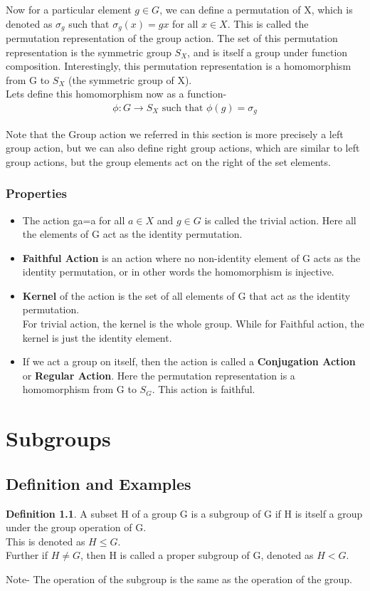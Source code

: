 \documentclass[12pt,a4paper,oneside]{report}
\theoremstyle{definition}
\newtheorem{definition}{Definition}[chapter]
\begin{document}
Now for a particular element $g\in G$, we can define a permutation of X, which is denoted as $\sigma_g$ such that $\sigma_g(x)=gx$ for all $x\in X$. This is called the permutation representation of the group action. The set of this permutation representation is the symmetric group $S_X$, and is itself a group under function composition.
Interestingly, this permutation representation is a homomorphism from G to $S_X$ (the symmetric group of X).
\\Lets define this homomorphism now as a function- 
\begin{align*}
  \phi: G \rightarrow S_X \text{ such that } \phi(g)=\sigma_g
\end{align*}

Note that the Group action we referred in this section is more precisely a left group action, but we can also define right group actions, which are similar to left group actions, but the group elements act on the right of the set elements.
\subsection{Properties}
\begin{itemize}
  \item The action ga=a for all $a \in X$ and $g \in G$ is called the trivial action. Here all the elements of G act as the identity permutation.
  \item \textbf{Faithful Action} is an action where no non-identity element of G acts as the identity permutation, or in other words the homomorphism is injective.
  \item \textbf{Kernel} of the action is the set of all elements of G that act as the identity permutation. \\For trivial action, the kernel is the whole group. While for Faithful action, the kernel is just the identity element.
  \item If we act a group on itself, then the action is called a \textbf{Conjugation Action} or \textbf{Regular Action}. Here the permutation representation is a homomorphism from G to $S_G$. This action is faithful.
\end{itemize}
\chapter{Subgroups}
\section{Definition and Examples}
\begin{definition}
  A subset H of a group G is a subgroup of G if H is itself a group under the group operation of G.
  \\This is denoted as $H \leq G$.
  \\Further if $H \neq G$, then H is called a proper subgroup of G, denoted as $H < G$.
\end{definition}
Note- The operation of the subgroup is the same as the operation of the group.
\end{document}
